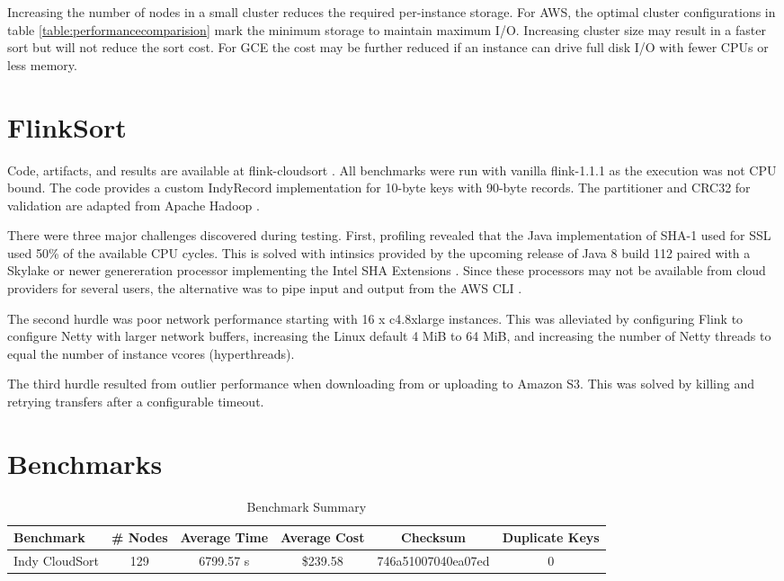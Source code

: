 \documentclass{article}
\begin{document}
Increasing the number of nodes in a small cluster reduces the required per-instance storage. For AWS, the optimal cluster configurations in table \ref{table:performancecomparision} mark the minimum storage to maintain maximum I/O.  Increasing cluster size may result in a faster sort but will not reduce the sort cost. For GCE the cost may be further reduced if an instance can drive full disk I/O with fewer CPUs or less memory.

\section{FlinkSort}

Code, artifacts, and results are available at flink-cloudsort \cite{flink-cloudsort}. All benchmarks were run with vanilla flink-1.1.1 \cite{flink-1.1.1} as the execution was not CPU bound. The code provides a custom IndyRecord implementation for 10-byte keys with 90-byte records. The partitioner and CRC32 for validation are adapted from Apache Hadoop \cite{apachehadoop}.

There were three major challenges discovered during testing. First, profiling revealed that the Java implementation of SHA-1 used for SSL used 50\% of the available CPU cycles. This is solved with intinsics provided by the upcoming release of Java 8 build 112 paired with a Skylake or newer genereration processor implementing the Intel SHA Extensions \cite{intel-sha-extensions}. Since these processors may not be available from cloud providers for several users, the alternative was to pipe input and output from the AWS CLI \cite{awscli}.

The second hurdle was poor network performance starting with 16 x c4.8xlarge instances. This was alleviated by configuring Flink to configure Netty with larger network buffers, increasing the Linux default 4 MiB to 64 MiB, and increasing the number of Netty threads to equal the number of instance vcores (hyperthreads).

The third hurdle resulted from outlier performance when downloading from or uploading to Amazon S3. This was solved by killing and retrying transfers after a configurable timeout.

\section{Benchmarks}

\begin{table}
  \begin{adjustwidth}{-1.5in}{-1.5in}  
    \centering
    \begin{tabular}{ | l | c | c | c | c | c | }
      \hline
      Benchmark & \# Nodes & Average Time & Average Cost & Checksum & Duplicate Keys \\
      \hline
      Indy CloudSort & 129 & 6799.57 s & \$239.58 & 746a51007040ea07ed & 0 \\
      \hline
    \end{tabular}
    \caption{Benchmark Summary}
    \label{table:benchmarksummary}
  \end{adjustwidth}
\end{table}
\end{document}
